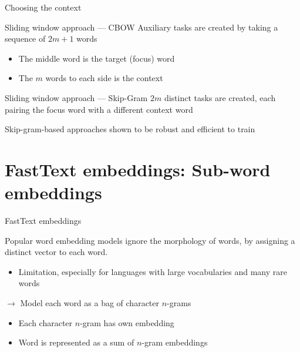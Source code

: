 \documentclass[12pt,aspectratio=169,handout]{beamer}
\begin{document}
\begin{frame}{Choosing the context}

\begin{block}{Sliding window approach --- CBOW}
Auxiliary tasks are created by taking a sequence of $2m + 1$ words
\begin{itemize}
	\item The middle word is the target (focus) word
	\item The $m$ words to each side is the context
\end{itemize}
\end{block}

\begin{block}{Sliding window approach --- Skip-Gram}
$2m$ distinct tasks are created, each pairing the focus word with a different context word
\end{block}	

Skip-gram-based approaches shown to be robust and efficient to train

\end{frame}

\section{FastText embeddings: Sub-word embeddings}

\begin{frame}{FastText embeddings}

Popular word embedding models ignore the morphology of words, by assigning a distinct vector to each word.
\begin{itemize}
\item Limitation, especially for languages with large vocabularies and many rare words
\end{itemize}

\pause

$\to$ Model each word as a bag of character $n$-grams
\begin{itemize}
\item Each character $n$-gram has own embedding
\item Word is represented as a sum of $n$-gram embeddings	
\end{itemize}



\end{frame}
\end{document}
